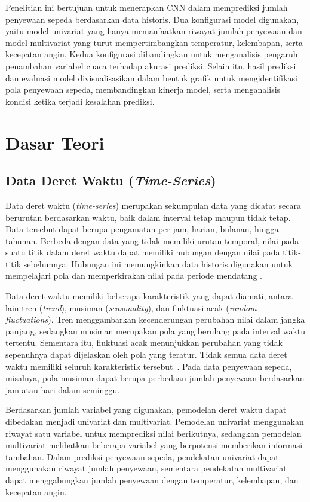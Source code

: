 \documentclass[10pt,conference]{IEEEtran}
\begin{document}
Penelitian ini bertujuan untuk menerapkan CNN dalam memprediksi jumlah penyewaan sepeda berdasarkan data historis. Dua konfigurasi model digunakan, yaitu model univariat yang hanya memanfaatkan riwayat jumlah penyewaan dan model multivariat yang turut mempertimbangkan temperatur, kelembapan, serta kecepatan angin. Kedua konfigurasi dibandingkan untuk menganalisis pengaruh penambahan variabel cuaca terhadap akurasi prediksi. Selain itu, hasil prediksi dan evaluasi model divisualisasikan dalam bentuk grafik untuk mengidentifikasi pola penyewaan sepeda, membandingkan kinerja model, serta menganalisis kondisi ketika terjadi kesalahan prediksi.

\section{Dasar Teori}

\subsection{Data Deret Waktu (\textit{Time-Series})}

Data deret waktu (\textit{time-series}) merupakan sekumpulan data yang dicatat secara berurutan berdasarkan waktu, baik dalam interval tetap maupun tidak tetap. Data tersebut dapat berupa pengamatan per jam, harian, bulanan, hingga tahunan. Berbeda dengan data yang tidak memiliki urutan temporal, nilai pada suatu titik dalam deret waktu dapat memiliki hubungan dengan nilai pada titik-titik sebelumnya. Hubungan ini memungkinkan data historis digunakan untuk mempelajari pola dan memperkirakan nilai pada periode mendatang \cite{forecasting}.

Data deret waktu memiliki beberapa karakteristik yang dapat diamati, antara lain tren (\textit{trend}), musiman (\textit{seasonality}), dan fluktuasi acak (\textit{random fluctuations}). Tren menggambarkan kecenderungan perubahan nilai dalam jangka panjang, sedangkan musiman merupakan pola yang berulang pada interval waktu tertentu. Sementara itu, fluktuasi acak menunjukkan perubahan yang tidak sepenuhnya dapat dijelaskan oleh pola yang teratur. Tidak semua data deret waktu memiliki seluruh karakteristik tersebut~\cite{forecasting}. Pada data penyewaan sepeda, misalnya, pola musiman dapat berupa perbedaan jumlah penyewaan berdasarkan jam atau hari dalam seminggu.

Berdasarkan jumlah variabel yang digunakan, pemodelan deret waktu dapat dibedakan menjadi univariat dan multivariat. Pemodelan univariat menggunakan riwayat satu variabel untuk memprediksi nilai berikutnya, sedangkan pemodelan multivariat melibatkan beberapa variabel yang berpotensi memberikan informasi tambahan. Dalam prediksi penyewaan sepeda, pendekatan univariat dapat menggunakan riwayat jumlah penyewaan, sementara pendekatan multivariat dapat menggabungkan jumlah penyewaan dengan temperatur, kelembapan, dan kecepatan angin.
\end{document}
